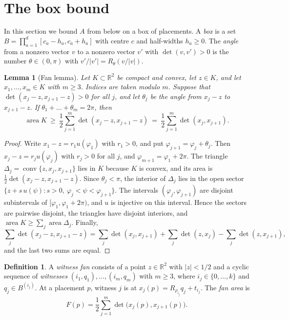 \documentclass[11pt]{amsart}
\newtheorem{lemma}[theorem]{Lemma}
\theoremstyle{definition}
\newtheorem{definition}[theorem]{Definition}
\theoremstyle{remark}
\numberwithin{equation}{section}
\newcommand{\R}{\mathbb{R}}
\newcommand{\area}{\operatorname{area}}
\newcommand{\conv}{\operatorname{conv}}
\begin{document}
\section{The box bound}\label{sec:box}

In this section we bound $A$ from below on a box of placements. A \emph{box} is a set $B=\prod_{a=1}^d[c_a-h_a,c_a+h_a]$ with centre $c$ and half-widths $h_a\ge0$. The \emph{angle} from a nonzero vector $v$ to a nonzero vector $v'$ with $\det(v,v')>0$ is the number $\theta\in(0,\pi)$ with $v'/|v'|=R_\theta(v/|v|)$.

\begin{lemma}[Fan lemma]\label{lem:fan}
Let $K\subset\R^2$ be compact and convex, let $z\in K$, and let $x_1,\dots,x_m\in K$ with $m\ge3$. Indices are taken modulo $m$. Suppose that $\det(x_j-z,x_{j+1}-z)>0$ for all $j$, and let $\theta_j$ be the angle from $x_j-z$ to $x_{j+1}-z$. If $\theta_1+\dots+\theta_m=2\pi$, then
\[
\area K\ \ge\ \frac12\sum_{j=1}^m\det(x_j-z,x_{j+1}-z)\ =\ \frac12\sum_{j=1}^m\det(x_j,x_{j+1}).
\]
\end{lemma}

\begin{proof}
Write $x_1-z=r_1u(\varphi_1)$ with $r_1>0$, and put $\varphi_{j+1}=\varphi_j+\theta_j$. Then $x_j-z=r_ju(\varphi_j)$ with $r_j>0$ for all $j$, and $\varphi_{m+1}=\varphi_1+2\pi$. The triangle $\Delta_j=\conv\{z,x_j,x_{j+1}\}$ lies in $K$ because $K$ is convex, and its area is $\frac12\det(x_j-z,x_{j+1}-z)$. Since $\theta_j<\pi$, the interior of $\Delta_j$ lies in the open sector $\{z+s\,u(\psi):s>0,\ \varphi_j<\psi<\varphi_{j+1}\}$. The intervals $(\varphi_j,\varphi_{j+1})$ are disjoint subintervals of $[\varphi_1,\varphi_1+2\pi)$, and $u$ is injective on this interval. Hence the sectors are pairwise disjoint, the triangles have disjoint interiors, and $\area K\ge\sum_j\area\Delta_j$. Finally,
\[
\sum_j\det(x_j-z,x_{j+1}-z)=\sum_j\det(x_j,x_{j+1})+\sum_j\det(z,x_j)-\sum_j\det(z,x_{j+1}),
\]
and the last two sums are equal.
\end{proof}

\begin{definition}\label{def:fan}
A \emph{witness fan} consists of a point $z\in\R^2$ with $|z|<1/2$ and a cyclic sequence of \emph{witnesses} $(i_1,q_1),\dots,(i_m,q_m)$ with $m\ge3$, where $i_j\in\{0,\dots,k\}$ and $q_j\in B^{(i_j)}$. At a placement $p$, witness $j$ is at $x_j(p)=R_{\rho_{i_j}}q_j+t_{i_j}$. The \emph{fan area} is
\[
F(p)=\frac12\sum_{j=1}^m\det\bigl(x_j(p),x_{j+1}(p)\bigr).
\]
\end{definition}
\end{document}

